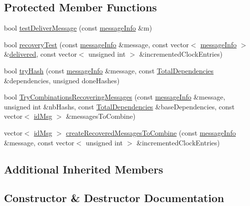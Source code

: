 \subsection*{Protected Member Functions}
\begin{DoxyCompactItemize}
\item 
bool \hyperlink{class_node_with_recovery_test_af9b78d0ed4fefb97e2f54c9279aa4655}{test\+Deliver\+Message} (const \hyperlink{structures_8h_a7e7bdc1d2fff8a9436f2f352b2711ed6}{message\+Info} \&m)
\item 
bool \hyperlink{class_node_with_recovery_test_a8e4f79eeb8c415ceca21b82f22eb9038}{recovery\+Test} (const \hyperlink{structures_8h_a7e7bdc1d2fff8a9436f2f352b2711ed6}{message\+Info} \&message, const vector$<$ \hyperlink{structures_8h_a7e7bdc1d2fff8a9436f2f352b2711ed6}{message\+Info} $>$ \&\hyperlink{class_node_with_control_aed34cc5a5b277c43f10f8cbbbeb59327}{delivered}, const vector$<$ unsigned int $>$ \&incremented\+Clock\+Entries)
\item 
bool \hyperlink{class_node_with_recovery_test_a5417b50e5d5e272c8ef70ff962c0ea86}{try\+Hash} (const \hyperlink{structures_8h_a7e7bdc1d2fff8a9436f2f352b2711ed6}{message\+Info} \&message, const \hyperlink{class_total_dependencies}{Total\+Dependencies} \&dependencies, unsigned done\+Hashes)
\item 
bool \hyperlink{class_node_with_recovery_test_ae1d2089be117daef7b2ee4dfd6b92e7d}{Try\+Combinations\+Recovering\+Messages} (const \hyperlink{structures_8h_a7e7bdc1d2fff8a9436f2f352b2711ed6}{message\+Info} \&message, unsigned int \&nb\+Hashs, const \hyperlink{class_total_dependencies}{Total\+Dependencies} \&base\+Dependencies, const vector$<$ \hyperlink{structures_8h_a83a1d9a070efa5341da84cfd8e28d3e5}{id\+Msg} $>$ \&messages\+To\+Combine)
\item 
vector$<$ \hyperlink{structures_8h_a83a1d9a070efa5341da84cfd8e28d3e5}{id\+Msg} $>$ \hyperlink{class_node_with_recovery_test_aa6b94e1bff36f3ec804d4ba136de96b8}{create\+Recovered\+Messages\+To\+Combine} (const \hyperlink{structures_8h_a7e7bdc1d2fff8a9436f2f352b2711ed6}{message\+Info} \&message, const vector$<$ unsigned int $>$ \&incremented\+Clock\+Entries)
\end{DoxyCompactItemize}
\subsection*{Additional Inherited Members}


\subsection{Constructor \& Destructor Documentation}
\mbox{\label{class_node_with_recovery_test_ae8676a479a3ad761eb6cd5069575f51f}} 

